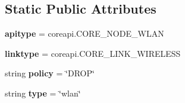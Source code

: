 \subsection*{Static Public Attributes}
\begin{DoxyCompactItemize}
\item 
\hypertarget{classcore_1_1netns_1_1nodes_1_1_wlan_node_af58e8f61e23a18c68cdfd341b44a62a2}{{\bfseries apitype} = coreapi.\+C\+O\+R\+E\+\_\+\+N\+O\+D\+E\+\_\+\+W\+L\+A\+N}\label{classcore_1_1netns_1_1nodes_1_1_wlan_node_af58e8f61e23a18c68cdfd341b44a62a2}

\item 
\hypertarget{classcore_1_1netns_1_1nodes_1_1_wlan_node_af0db5a2432b5a75b84e20054cc54189d}{{\bfseries linktype} = coreapi.\+C\+O\+R\+E\+\_\+\+L\+I\+N\+K\+\_\+\+W\+I\+R\+E\+L\+E\+S\+S}\label{classcore_1_1netns_1_1nodes_1_1_wlan_node_af0db5a2432b5a75b84e20054cc54189d}

\item 
\hypertarget{classcore_1_1netns_1_1nodes_1_1_wlan_node_aef3ccc7deaae933eece654c90d1c1230}{string {\bfseries policy} = \char`\"{}D\+R\+O\+P\char`\"{}}\label{classcore_1_1netns_1_1nodes_1_1_wlan_node_aef3ccc7deaae933eece654c90d1c1230}

\item 
\hypertarget{classcore_1_1netns_1_1nodes_1_1_wlan_node_a1d1799afd970eb83dcf338e617c918f6}{string {\bfseries type} = \char`\"{}wlan\char`\"{}}\label{classcore_1_1netns_1_1nodes_1_1_wlan_node_a1d1799afd970eb83dcf338e617c918f6}

\end{DoxyCompactItemize}



